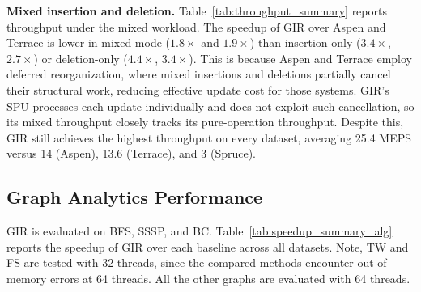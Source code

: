\textbf{Mixed insertion and deletion.}
Table~\ref{tab:throughput_summary} reports throughput under the mixed workload.
The speedup of GIR over Aspen and Terrace is lower in mixed mode ($1.8\times$ and $1.9\times$) than insertion-only ($3.4\times$, $2.7\times$) or deletion-only ($4.4\times$, $3.4\times$).
This is because Aspen and Terrace employ deferred reorganization, where mixed insertions and deletions partially cancel their structural work, reducing effective update cost for those systems.
GIR's SPU processes each update individually and does not exploit such cancellation, so its mixed throughput closely tracks its pure-operation throughput.
Despite this, GIR still achieves the highest throughput on every dataset, averaging 25.4 MEPS versus 14 (Aspen), 13.6 (Terrace), and 3 (Spruce).




\subsection{Graph Analytics Performance}
GIR is evaluated on BFS, SSSP, and BC.
Table~\ref{tab:speedup_summary_alg} reports the speedup of GIR over each baseline across all datasets.
Note, TW and FS are tested with 32 threads, since the compared methods encounter out-of-memory errors at 64 threads. All the other graphs are evaluated with 64 threads.

